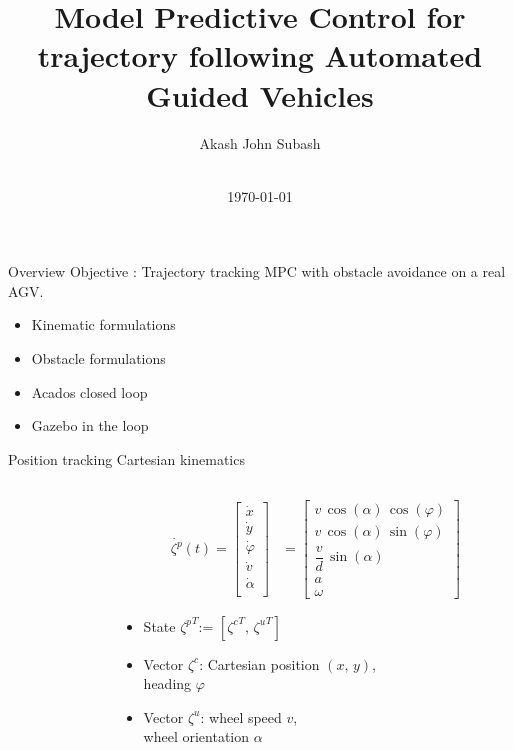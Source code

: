 \documentclass[10pt,aspectratio=1610]{beamer} %
\title[Model Predictive Control for trajectory following Automated Guided Vehicles]{\large Model Predictive Control for trajectory following Automated Guided Vehicles}
\author[\large Akash John Subash]{\large Akash John Subash}
\institute{\large Systems Control and Optimization \& ek robotics}
\date[\today]{\\ \today }
\begin{document}
\InsertTitle


\begin{frame}{Overview}
	\large{Objective : Trajectory tracking MPC with obstacle avoidance on a real AGV.}
	\hfill \break
	\begin{itemize}[label=\textbullet]\large
		\item Kinematic formulations
		\item Obstacle formulations
		\item Acados closed loop
		\item Gazebo in the loop
	\end{itemize}
\end{frame}

\begin{frame}{Position tracking Cartesian kinematics}
	\begin{columns}[onlytextwidth]
		\begin{column}{0.5\textwidth}
			\begin{center}
			\def\svgwidth{1.0\textwidth}
			
			\end{center}
		\end{column}
		\begin{column}{0.5\textwidth}
			\begin{align*}
				\dot{\zeta^{p}}(t) = \begin{bmatrix}
					\dot{x}\\
					\dot{y}\\
					\dot{\varphi}\\
					\dot{v}\\
					\dot{\alpha}\\
				\end{bmatrix} & = 
				\begin{bmatrix}
					v\, \cos(\alpha)\, \cos(\varphi)\\
					v\, \cos(\alpha)\, \sin(\varphi)\\
					\dfrac{v}{d}\, \sin(\alpha)\\
					a\\
					\omega 
				\end{bmatrix}
			\end{align*}
		
		\begin{itemize}[label=\textbullet]
			\item State ${\zeta^{p}}^T$:= $[{\zeta^{c}}^T,\,{\zeta^{u}}^T]$
			\item Vector $\zeta^{c}$: Cartesian position $(x,\, y)$,\\
			\hspace{0.62in} heading $\varphi$
			\item Vector $\zeta^{u}$: wheel speed $v$,\\ 
			\hspace{0.62in} wheel orientation $\alpha$
		\end{itemize}
		\end{column}
	\end{columns}
\end{frame}
\end{document}

